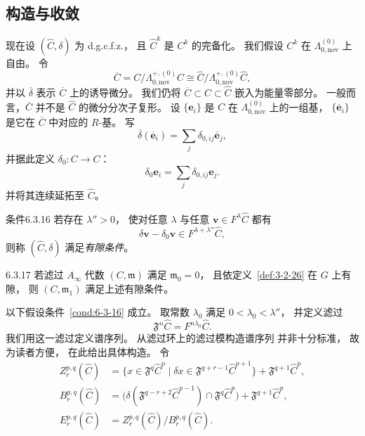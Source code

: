 
\subsection{构造与收敛}
\label{subsec:6-3-3}

现在设 $(\widehat C,\delta)$ 为 d.g.c.f.z.，
且 $\widehat C^k$ 是 $C^k$ 的完备化。
我们假设 $C^k$ 在
$\Lambda_{0,\mathrm{nov}}^{(0)}$ 上自由。
令
\[
\overline C
=C/\Lambda_{0,\mathrm{nov}}^{+,(0)}C
\cong
\widehat C/
\Lambda_{0,\mathrm{nov}}^{+,(0)}\widehat C,
\]
并以 $\overline\delta$ 表示
$\overline C$ 上的诱导微分。
我们仍将 $\overline C\subset C\subset\widehat C$
嵌入为能量零部分。
一般而言，$\overline C$
并不是 $\widehat C$ 的微分分次子复形。
设 $\{\mathbf e_i\}$ 是 $C$
在 $\Lambda_{0,\mathrm{nov}}^{(0)}$ 上的一组基，
$\{\overline{\mathbf e}_i\}$
是它在 $\overline C$
中对应的 $R$-基。
写
\[
\overline\delta(\overline{\mathbf e}_i)
=\sum_j\delta_{0,ij}\overline{\mathbf e}_j,
\]
并据此定义 $\delta_0:C\to C$：
\[
\delta_0\mathbf e_i
=\sum_j\delta_{0,ij}\mathbf e_j.
\]
并将其连续延拓至 $\widehat C$。

\begin{statement}{条件}{6.3.16}\label{cond:6-3-16}
若存在 $\lambda''>0$，
使对任意 $\lambda$ 与任意
$\mathbf v\in F^\lambda\widehat C$ 都有
\[
\delta\mathbf v-\delta_0\mathbf v
\in F^{\lambda+\lambda''}\widehat C,
\]
则称 $(\widehat C,\delta)$
满足\emph{有隙条件}。
\end{statement}

\begin{remark}{6.3.17}\label{rem:6-3-17}
若滤过 $A_\infty$ 代数 $(C,\mathfrak m)$
满足 $\mathfrak m_0=0$，
且依定义~\ref{def:3-2-26}
在 $G$ 上有隙，
则 $(C,\mathfrak m_1)$
满足上述有隙条件。
\end{remark}

以下假设条件~\ref{cond:6-3-16} 成立。
取常数 $\lambda_0$ 满足
$0<\lambda_0<\lambda''$，
并定义滤过
\begin{equation}
\mathfrak F^n\widehat C
=F^{n\lambda_0}\widehat C.
\tag{6.3.18}\label{eq:6-3-18}
\end{equation}
我们用这一滤过定义谱序列。
从滤过环上的滤过模构造谱序列
并非十分标准，
故为读者方便，
在此给出具体构造。
令
\begin{align}
Z_r^{p,q}(\widehat C)
&=\bigl\{x\in\mathfrak F^q\widehat C^p
\mid\delta x\in
\mathfrak F^{q+r-1}\widehat C^{p+1}\bigr\}
+\mathfrak F^{q+1}\widehat C^p,
\tag{6.3.19.1}\label{eq:6-3-19-1}\\
B_r^{p,q}(\widehat C)
&=\bigl(
\delta(\mathfrak F^{q-r+2}\widehat C^{p-1})
\cap\mathfrak F^q\widehat C^p
\bigr)+\mathfrak F^{q+1}\widehat C^p,
\tag{6.3.19.2}\label{eq:6-3-19-2}\\
E_r^{p,q}(\widehat C)
&=Z_r^{p,q}(\widehat C)
/B_r^{p,q}(\widehat C).
\tag{6.3.19.3}\label{eq:6-3-19-3}
\end{align}

